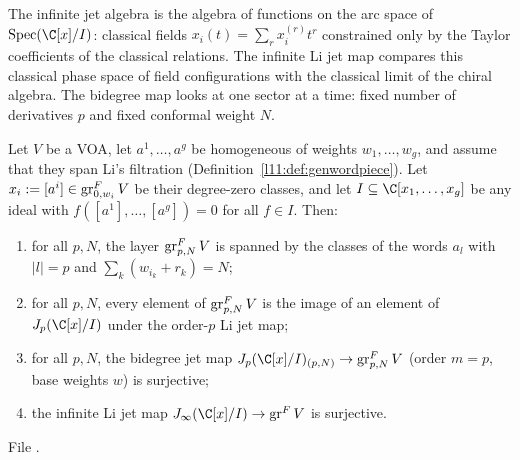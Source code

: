\begin{physics}
The infinite jet algebra is the algebra of functions on the arc space of $\operatorname{Spec}(\C[x]/I)$: classical
fields $x_i(t) = \sum_rx_i^{(r)}t^r$ constrained only by the Taylor coefficients of the classical relations. The infinite
Li jet map compares this classical phase space of field configurations with the classical limit of the chiral
algebra. The bidegree map looks at one sector at a time: fixed number of derivatives $p$ and fixed conformal weight $N$.
\end{physics}

\begin{theorem}\label{l11:thm:genwordsurj}
Let $V$ be a VOA, let $a^1,\dots,a^g$ be homogeneous of weights $w_1,\dots,w_g$, and assume that they span Li's filtration
(Definition~\ref{l11:def:genwordpiece}). Let $x_i := [a^i]\in\operatorname{gr}^F_{0,w_i}V$ be their degree-zero classes, and let
$I\subseteq\C[x_1,\dots,x_g]$ be any ideal with $f([a^1],\dots,[a^g]) = 0$ for all $f\in I$. Then:
\begin{enumerate}
\item for all $p,N$, the layer $\operatorname{gr}^F_{p,N}V$ is spanned by the classes of the words $a_l$ with $|l| = p$ and
  $\sum_k(w_{i_k}+r_k) = N$;
\item for all $p,N$, every element of $\operatorname{gr}^F_{p,N}V$ is the image of an element of $J_p(\C[x]/I)$ under the
  order-$p$ Li jet map;
\item for all $p,N$, the bidegree jet map $J_p(\C[x]/I)_{(p,N)}\to\lelevengr^F_{p,N}V$ (order $m=p$, base weights $w$) is
  surjective;
\item the infinite Li jet map $J_\infty(\C[x]/I)\to\lelevengr^FV$ is surjective.
\end{enumerate}
\end{theorem}
\noindent File .
